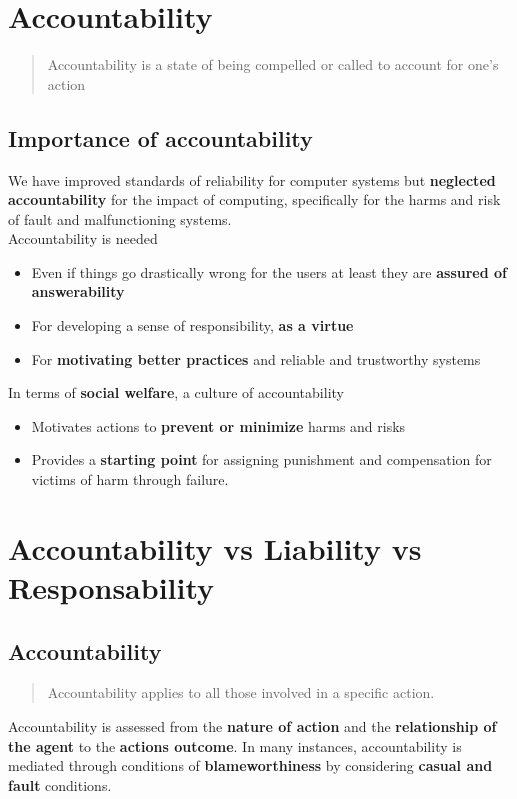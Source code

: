 \documentclass{article}
\begin{document}
\tableofcontents

\newpage

\section{Accountability}
\begin{quotation}
Accountability is a state of being compelled or called to account for one’s action
\end{quotation}

\subsection{Importance of accountability}
\begin{flushleft}
We have improved standards of reliability for computer systems but \textbf{neglected accountability} for the impact of computing, specifically for the harms and risk of fault and malfunctioning systems. \\
Accountability is needed
\begin{itemize} 
  \item Even if things go drastically wrong for the users at least they are \textbf{assured of answerability}
  \item For developing a sense of responsibility, \textbf{as a virtue}
  \item For \textbf{motivating better practices} and reliable and trustworthy systems
\end{itemize}
In terms of \textbf{social welfare}, a culture of accountability
\begin{itemize}
  \item Motivates actions to \textbf{prevent or minimize} harms and risks
  \item Provides a \textbf{starting point} for assigning punishment and compensation for victims of harm through failure.
\end{itemize}
\end{flushleft}

\section{Accountability vs Liability vs Responsability}

\subsection{Accountability}
\begin{quote}
Accountability applies to all those involved in a specific action.
\end{quote}
\begin{flushleft}
Accountability is assessed from the \textbf{nature of action} and the \textbf{relationship of the agent} to the \textbf{actions outcome}. In many instances, accountability is mediated through conditions of \textbf{blameworthiness} by considering \textbf{casual and fault} conditions.
\end{flushleft}
\end{document}
